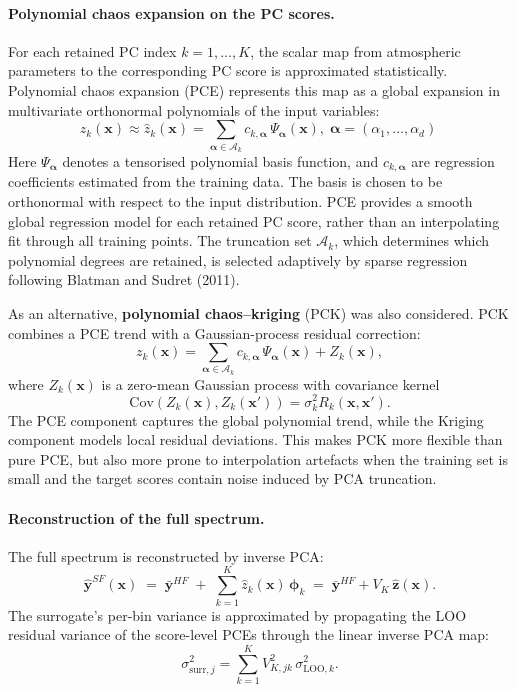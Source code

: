 \documentclass[11pt,a4paper]{article}
\newcommand{\xv}{\bm{x}}
\newcommand{\yv}{\bm{y}}
\begin{document}
\paragraph{Polynomial chaos expansion on the PC scores.}
\label{sec:pcapck}
For each retained PC index \(k=1,\dots,K\), the scalar map from
atmospheric parameters to the corresponding PC score is approximated
statistically. Polynomial chaos expansion (PCE) represents this map as a
global expansion in multivariate orthonormal polynomials of the input
variables:
\[
z_k(\xv)
\approx
\hat z_{k}(\xv)
=
\sum_{\bm{\alpha}\in\mathcal{A}_{k}}
c_{k,\bm{\alpha}}\,
\Psi_{\bm{\alpha}}(\xv), \; \bm{\alpha}=(\alpha_1,\dots,\alpha_d)\
\]
Here
\(\Psi_{\bm{\alpha}}\) denotes a tensorised polynomial basis function,
and \(c_{k,\bm{\alpha}}\) are regression coefficients estimated from
the training data. The basis is chosen to be orthonormal with respect to
the input distribution. PCE provides a
smooth global regression model for each retained PC score, rather than
an interpolating fit through all training points. The truncation set
\(\mathcal{A}_{k}\), which determines which polynomial
degrees are retained, is selected adaptively by sparse regression following Blatman and Sudret (2011).

As an alternative, \textbf{polynomial chaos--kriging} (PCK) was also considered.
PCK combines a PCE trend with a Gaussian-process residual correction:
\[
z_k(\xv)
=
\sum_{\bm{\alpha}\in\mathcal{A}_{k}}
c_{k,\bm{\alpha}}\,
\Psi_{\bm{\alpha}}(\xv)
+
Z_k(\xv),
\]
where \(Z_k(\xv)\) is a zero-mean Gaussian process with covariance
kernel
\[
\mathrm{Cov}\!\left(Z_k(\xv),Z_k(\xv')\right)
=
\sigma_k^2 R_k(\xv,\xv').
\]
The PCE component captures the global polynomial trend, while the
Kriging component models local residual deviations.
This makes PCK more flexible than pure PCE, but also more prone to
interpolation artefacts when the training set is small and the target
scores contain noise induced by PCA truncation.


\paragraph{Reconstruction of the full spectrum.}
The full spectrum is reconstructed by inverse PCA:
\[
\hat{\yv}^{SF}(\xv) \;=\; \bar{\yv}^{HF}
\;+\; \sum_{k=1}^{K} \hat z_{k}(\xv)\,\bm{\phi}_{k}
\;=\; \bar{\yv}^{HF} + V_{K}\,\hat{\bm z}(\xv).
\]
The surrogate's per-bin variance is approximated by propagating the LOO residual
variance of the score-level PCEs through the linear inverse PCA map:
\[
\sigma^{2}_{\mathrm{surr},j}
=
\sum_{k=1}^{K} V_{K,jk}^{2}\,\sigma^{2}_{\mathrm{LOO},k}.
\]
\end{document}
